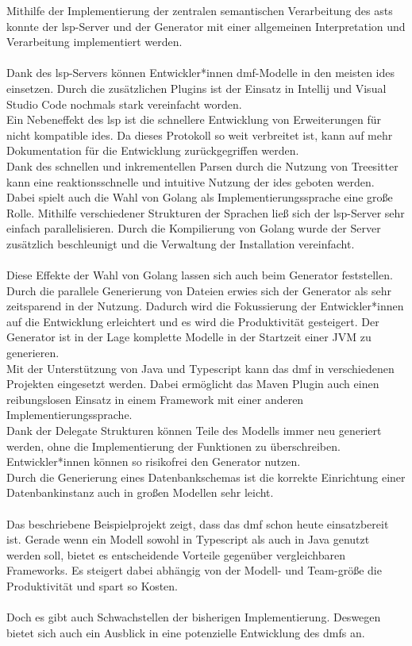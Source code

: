 \documentclass[./einleitung.tex]{subfiles}
\begin{document}
Mithilfe der Implementierung der zentralen semantischen Verarbeitung des \acrshort{ast}s konnte der \acrshort{lsp}-Server und der Generator mit einer allgemeinen Interpretation und Verarbeitung implementiert werden.
\\\\
Dank des \acrshort{lsp}-Servers können Entwickler*innen \acrshort{dmf}-Modelle in den meisten \acrshort{ide}s einsetzen.
Durch die zusätzlichen Plugins ist der Einsatz in Intellij und Visual Studio Code nochmals stark vereinfacht worden.\\
Ein Nebeneffekt des \acrshort{lsp} ist die schnellere Entwicklung von Erweiterungen für nicht kompatible \acrshort{ide}s.
Da dieses Protokoll so weit verbreitet ist, kann auf mehr Dokumentation für die Entwicklung zurückgegriffen werden.\\
Dank des schnellen und inkrementellen Parsen durch die Nutzung von Treesitter kann eine reaktionsschnelle und intuitive Nutzung der \acrshort{ide}s geboten werden.
Dabei spielt auch die Wahl von Golang als Implementierungssprache eine große Rolle.
Mithilfe verschiedener Strukturen der Sprachen ließ sich der \acrshort{lsp}-Server sehr einfach parallelisieren.
Durch die Kompilierung von Golang wurde der Server zusätzlich beschleunigt und die Verwaltung der Installation vereinfacht.
\\\\
Diese Effekte der Wahl von Golang lassen sich auch beim Generator feststellen.
Durch die parallele Generierung von Dateien erwies sich der Generator als sehr zeitsparend in der Nutzung.
Dadurch wird die Fokussierung der Entwickler*innen auf die Entwicklung erleichtert und es wird die Produktivität gesteigert.
Der Generator ist in der Lage komplette Modelle in der Startzeit einer JVM zu generieren.\\
Mit der Unterstützung von Java und Typescript kann das \acrshort{dmf} in verschiedenen Projekten eingesetzt werden.
Dabei ermöglicht das Maven Plugin auch einen reibungslosen Einsatz in einem Framework mit einer anderen Implementierungssprache.\\
Dank der Delegate Strukturen können Teile des Modells immer neu generiert werden, ohne die Implementierung der Funktionen zu überschreiben.
Entwickler*innen können so risikofrei den Generator nutzen.\\
Durch die Generierung eines Datenbankschemas ist die korrekte Einrichtung einer Datenbankinstanz auch in großen Modellen sehr leicht.
\\\\
Das beschriebene Beispielprojekt zeigt, dass das \acrshort{dmf} schon heute einsatzbereit ist.
Gerade wenn ein Modell sowohl in Typescript als auch in Java genutzt werden soll, bietet es entscheidende Vorteile gegenüber vergleichbaren Frameworks.
Es steigert dabei abhängig von der Modell- und Team-größe die Produktivität und spart so Kosten.
\\\\
Doch es gibt auch Schwachstellen der bisherigen Implementierung.
Deswegen bietet sich auch ein Ausblick in eine potenzielle Entwicklung des \acrshort{dmf}s an.
\end{document}

